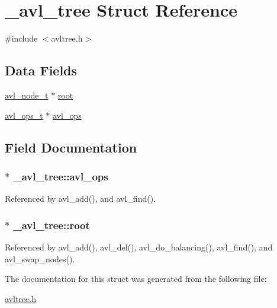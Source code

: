 \hypertarget{struct__avl__tree}{\section{\-\_\-avl\-\_\-tree Struct Reference}
\label{struct__avl__tree}
}


{\ttfamily \#include $<$avltree.\-h$>$}

\subsection*{Data Fields}
\begin{DoxyCompactItemize}
\item 
\hyperlink{avltree_8h_a5b416671ef04de3931de053f42a0013e}{avl\-\_\-node\-\_\-t} $\ast$ \hyperlink{struct__avl__tree_ac7aee463fae453083b76df847ec31bf0}{root}
\item 
\hyperlink{avltree_8h_aa4f60c2d46e4517acbc40505f4101679}{avl\-\_\-ops\-\_\-t} $\ast$ \hyperlink{struct__avl__tree_ab6df5ac1d910ac594900de12eee93121}{avl\-\_\-ops}
\end{DoxyCompactItemize}


\subsection{Field Documentation}
\hypertarget{struct__avl__tree_ab6df5ac1d910ac594900de12eee93121}{
\subsubsection[{avl\-\_\-ops}]{$\ast$ \-\_\-avl\-\_\-tree\-::avl\-\_\-ops}}\label{struct__avl__tree_ab6df5ac1d910ac594900de12eee93121}


Referenced by avl\-\_\-add(), and avl\-\_\-find().

\hypertarget{struct__avl__tree_ac7aee463fae453083b76df847ec31bf0}{
\subsubsection[{root}]{$\ast$ \-\_\-avl\-\_\-tree\-::root}}\label{struct__avl__tree_ac7aee463fae453083b76df847ec31bf0}


Referenced by avl\-\_\-add(), avl\-\_\-del(), avl\-\_\-do\-\_\-balancing(), avl\-\_\-find(), and avl\-\_\-swap\-\_\-nodes().



The documentation for this struct was generated from the following file\-:\begin{DoxyCompactItemize}
\item 
\hyperlink{avltree_8h}{avltree.\-h}\end{DoxyCompactItemize}
